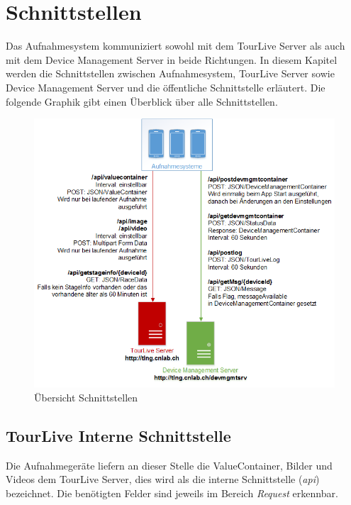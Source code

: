 \chapter{Schnittstellen}

Das Aufnahmesystem kommuniziert sowohl mit dem TourLive Server als auch mit dem Device Management Server in beide Richtungen. In diesem Kapitel werden die Schnittstellen zwischen Aufnahmesystem, TourLive Server sowie Device Management Server und die öffentliche Schnittstelle erläutert. Die folgende Graphik gibt einen Überblick über alle Schnittstellen.

\begin{figure}[H]
	\centering
	\includegraphics[width=130mm]{images/uebersicht_schnittstelle.png}
	\caption{Übersicht Schnittstellen}
\end{figure}

\section{TourLive Interne Schnittstelle}
\label{sec:tourliveserverapi}
Die Aufnahmegeräte liefern an dieser Stelle die ValueContainer, Bilder und Videos dem TourLive Server, dies wird als die interne Schnittstelle (\textit{\gls{api}}) bezeichnet. Die benötigten Felder sind jeweils im Bereich \textit{Request} erkennbar.

